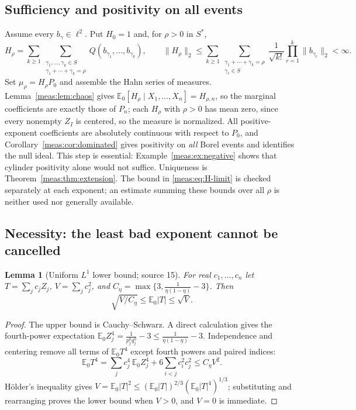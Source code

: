 \documentclass[11pt]{article}
\numberwithin{equation}{section}
\newtheorem{lemma}[theorem]{Lemma}
\theoremstyle{definition}
\theoremstyle{remark}
\newcommand{\E}{\mathbb E}
\newcommand{\norm}[1]{\lVert#1\rVert}
\newcommand{\abs}[1]{\lvert#1\rvert}
\begin{document}
\subsection{Sufficiency and positivity on all events}

Assume every $b_\gamma\in\ell^2$. Put $H_0=1$ and, for $\rho>0$ in $S^*$,
\begin{equation}\label{meas:eq:H-limit}
 H_\rho=\sum_{k\ge1}\sum_{\substack{\gamma_1,\ldots,\gamma_k\in S\\\gamma_1+\cdots+\gamma_k=\rho}}
 Q(b_{\gamma_1},\ldots,b_{\gamma_k}),\qquad
 \norm{H_\rho}_2\le\sum_{k\ge1}\sum_{\substack{\gamma_1+\cdots+\gamma_k=\rho\\\gamma_r\in S}}
 \frac1{\sqrt{k!}}\prod_{r=1}^k\norm{b_{\gamma_r}}_2<\infty .
\end{equation}
Set $\mu_\rho=H_\rho P_0$ and assemble the Hahn series of measures.
Lemma~\ref{meas:lem:chaos} gives $\E_0[H_\rho\mid X_1,\ldots,X_n]=H_{\rho,n}$, so the
marginal coefficients are exactly those of $P_n$; each $H_\rho$ with $\rho>0$ has
mean zero, since every nonempty $Z_I$ is centered, so the measure is normalized.
All positive-exponent coefficients are absolutely continuous with respect to
$P_0$, and Corollary~\ref{meas:cor:dominated} gives positivity on \emph{all} Borel
events and identifies the null ideal. This step is essential:
Example~\ref{meas:ex:negative} shows that cylinder positivity alone would not
suffice. Uniqueness is Theorem~\ref{meas:thm:extension}. The bound in
\eqref{meas:eq:H-limit} is checked separately at each exponent; an estimate
summing these bounds over all $\rho$ is neither used nor generally available.

\subsection{Necessity: the least bad exponent cannot be cancelled}

\begin{lemma}[Uniform $L^1$ lower bound; source 15]\label{meas:lem:L1lower}
For real $c_1,\ldots,c_n$ let $T=\sum_jc_jZ_j$, $V=\sum_jc_j^2$, and
$C_\eta=\max\{3,\frac1{\eta(1-\eta)}-3\}$. Then
\begin{equation}\label{meas:eq:L1lower}
 \sqrt{V/C_\eta}\le\E_0\abs T\le\sqrt V .
\end{equation}
\end{lemma}
\begin{proof}
The upper bound is Cauchy--Schwarz. A direct calculation gives the fourth-power
expectation $\E_0Z_j^4=\frac1{p_j^0q_j^0}-3\le\frac1{\eta(1-\eta)}-3$. Independence and
centering remove all terms of $\E_0T^4$ except fourth powers and paired indices:
\[
 \E_0T^4=\sum_jc_j^4\,\E_0Z_j^4+6\sum_{i<j}c_i^2c_j^2\le C_\eta V^2 .
\]
H\"older's inequality gives $V=\E_0\abs T^2\le(\E_0\abs T)^{2/3}(\E_0\abs T^4)^{1/3}$;
substituting and rearranging proves the lower bound when $V>0$, and $V=0$ is
immediate.
\end{proof}
\end{document}
